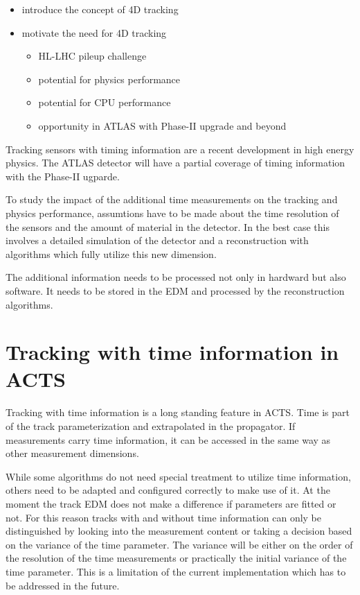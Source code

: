 \begin{itemize}
    \color{red}
    \item introduce the concept of 4D tracking
    \item motivate the need for 4D tracking
    \begin{itemize}
        \item HL-LHC pileup challenge
        \item potential for physics performance
        \item potential for CPU performance
        \item opportunity in ATLAS with Phase-II upgrade and beyond
    \end{itemize}
\end{itemize}

Tracking sensors with timing information are a recent development in high energy physics. The ATLAS detector will have a partial coverage of timing information with the Phase-II ugparde.

To study the impact of the additional time measurements on the tracking and physics performance, assumtions have to be made about the time resolution of the sensors and the amount of material in the detector. In the best case this involves a detailed simulation of the detector and a reconstruction with algorithms which fully utilize this new dimension.

The additional information needs to be processed not only in hardward but also software. It needs to be stored in the EDM and processed by the reconstruction algorithms.

\section{Tracking with time information in ACTS}

Tracking with time information is a long standing feature in ACTS. Time is part of the track parameterization and extrapolated in the propagator. If measurements carry time information, it can be accessed in the same way as other measurement dimensions.

While some algorithms do not need special treatment to utilize time information, others need to be adapted and configured correctly to make use of it. At the moment the track EDM does not make a difference if parameters are fitted or not. For this reason tracks with and without time information can only be distinguished by looking into the measurement content or taking a decision based on the variance of the time parameter. The variance will be either on the order of the resolution of the time measurements or practically the initial variance of the time parameter. This is a limitation of the current implementation which has to be addressed in the future.

